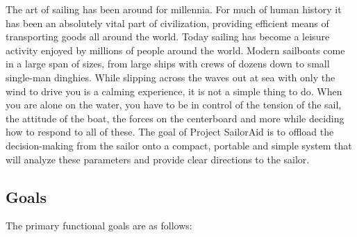
The art of sailing has been around for millennia. For much of human history it has been an absolutely vital part of civilization, providing efficient means of transporting goods all around the world. Today sailing has become a leisure activity enjoyed by millions of people around the world. Modern sailboats come in a large span of sizes, from large ships with crews of dozens down to small single-man dinghies. While slipping across the waves out at sea with only the wind to drive you is a calming experience, it is not a simple thing to do. When you are alone on the water, you have to be in control of the tension of the sail, the attitude of the boat, the forces on the centerboard and more while deciding how to respond to all of these. The goal of Project SailorAid is to offload the decision-making from the sailor onto a compact, portable and simple system that will analyze these parameters and provide clear directions to the sailor. 

\subsection{Goals}
The primary functional goals are as follows:

